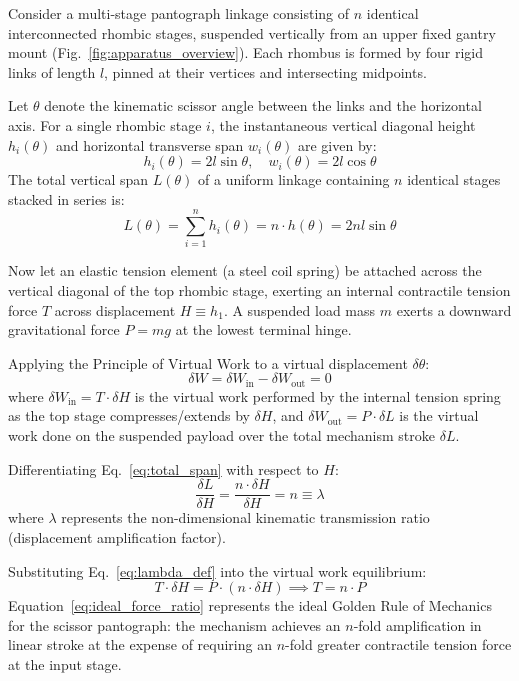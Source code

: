 \documentclass[10pt,twocolumn]{article}
\begin{document}
Consider a multi-stage pantograph linkage consisting of $n$ identical interconnected rhombic stages, suspended vertically from an upper fixed gantry mount (Fig.~\ref{fig:apparatus_overview}). Each rhombus is formed by four rigid links of length $l$, pinned at their vertices and intersecting midpoints.

Let $\theta$ denote the kinematic scissor angle between the links and the horizontal axis. For a single rhombic stage $i$, the instantaneous vertical diagonal height $h_i(\theta)$ and horizontal transverse span $w_i(\theta)$ are given by:
\begin{equation}
    h_i(\theta) = 2 l \sin \theta, \quad w_i(\theta) = 2 l \cos \theta
    \label{eq:rhombus_geom}
\end{equation}
The total vertical span $L(\theta)$ of a uniform linkage containing $n$ identical stages stacked in series is:
\begin{equation}
    L(\theta) = \sum_{i=1}^n h_i(\theta) = n \cdot h(\theta) = 2 n l \sin \theta
    \label{eq:total_span}
\end{equation}

Now let an elastic tension element (a steel coil spring) be attached across the vertical diagonal of the top rhombic stage, exerting an internal contractile tension force $T$ across displacement $H \equiv h_1$. A suspended load mass $m$ exerts a downward gravitational force $P = m g$ at the lowest terminal hinge.

Applying the Principle of Virtual Work to a virtual displacement $\delta \theta$:
\begin{equation}
    \delta W = \delta W_{\mathrm{in}} - \delta W_{\mathrm{out}} = 0
\end{equation}
where $\delta W_{\mathrm{in}} = T \cdot \delta H$ is the virtual work performed by the internal tension spring as the top stage compresses/extends by $\delta H$, and $\delta W_{\mathrm{out}} = P \cdot \delta L$ is the virtual work done on the suspended payload over the total mechanism stroke $\delta L$.

Differentiating Eq.~\eqref{eq:total_span} with respect to $H$:
\begin{equation}
    \frac{\delta L}{\delta H} = \frac{n \cdot \delta H}{\delta H} = n \equiv \lambda
    \label{eq:lambda_def}
\end{equation}
where $\lambda$ represents the non-dimensional kinematic transmission ratio (displacement amplification factor).

Substituting Eq.~\eqref{eq:lambda_def} into the virtual work equilibrium:
\begin{equation}
    T \cdot \delta H = P \cdot (n \cdot \delta H) \implies T = n \cdot P
    \label{eq:ideal_force_ratio}
\end{equation}
Equation~\eqref{eq:ideal_force_ratio} represents the ideal Golden Rule of Mechanics for the scissor pantograph: the mechanism achieves an $n$-fold amplification in linear stroke at the expense of requiring an $n$-fold greater contractile tension force at the input stage.
\end{document}
